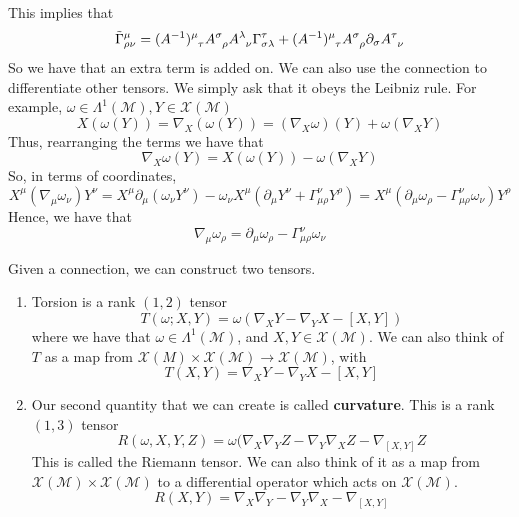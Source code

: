 \documentclass[11pt, a4paper]{article}   	%
\theoremstyle{slplain}
\begin{document}
This implies that 
\[
	\tilde{ \Gamma } ^ \mu _{ \rho \nu }  = ( A ^{ -1 } ) \indices{ ^ \mu _ \tau } A \indices{ ^ \sigma _ \rho } A \indices{ ^ \lambda _ \nu } \Gamma ^ \tau _{ \sigma \lambda } + ( A ^{ -1 } ) \indices{ ^ \mu _ \tau } A \indices{ ^ \sigma _ \rho } \partial  _ \sigma A \indices{ ^ \tau _ \nu }       
\]  So we have that an extra term is added on. 
We can also use the connection to differentiate 
other tensors. 
We simply ask that it obeys the Leibniz rule. 
For example, $ \omega \in \Lambda ^ 1 ( \mathcal{ M } ) , Y \in \mathcal{ X } ( \mathcal{ M } ) $ 
\[
	X ( \omega ( Y ) ) = \nabla _ X ( \omega ( Y ) )  = ( \nabla _ X \omega ) ( Y ) + \omega ( \nabla _ X Y ) 
\] Thus, rearranging the terms we have that 
\[
	\nabla _ X \omega ( Y )  = X ( \omega ( Y ) ) - \omega ( \nabla _ X Y ) 
\] So, in terms of coordinates, 
\[
	X^ \mu ( \nabla _ \mu \omega _ \nu ) Y ^ \nu = X^ \mu \partial  _ \mu ( \omega  _\nu Y ^ \nu ) - \omega _ \nu X^ \mu ( \partial  _ \mu Y ^ \nu + \Gamma ^ \nu _{ \mu \rho } Y ^ \rho )  = X ^ \mu ( \partial  _ \mu \omega _ \rho - \Gamma ^ \nu _{ \mu \rho } \omega _ \nu ) Y ^ \rho 
\] Hence, we have that 
\[
 \nabla _ \mu \omega _ \rho  = \partial  _ \mu \omega _ \rho  - \Gamma ^ \nu _{ \mu \rho } \omega _ \nu 
\]  %

Given a connection, we can construct two tensors. 
\begin{enumerate}
	\item Torsion is a rank $(1, 2) $ tensor
		\[
			T ( \omega; X, Y )  = \omega ( \nabla _ X Y - \nabla _ Y X - [ X, Y ] ) 
		\] where we have that $ \omega \in \Lambda^ 1 ( \mathcal{ M } ) $, 
		and $ X, Y \in \mathcal{ X } ( \mathcal{ M } ) $. 
		We can also think of $ T $ as a map from 
		$ \mathcal{ X } ( M ) \times \mathcal{ X } ( \mathcal{ M } ) \to \mathcal{ X } ( \mathcal{ M } ) $, with 
		\[
			T ( X, Y ) = \nabla _ X Y - \nabla _ Y X - [ X, Y ] 
		\] 
	\item Our second quantity that we can create is called \textbf{curvature}. 
		This is a rank $ ( 1, 3 )  $  tensor
		\[
			R ( \omega, X, Y , Z ) = \omega ( \nabla _ X \nabla  _ Y Z - \nabla _ Y \nabla  _ X Z - \nabla _{ [ X, Y ]  } Z 
		\] This is called the Riemann tensor. We can 
		also think of it as a map from $ \mathcal{ X  } ( \mathcal{ M } ) \times \mathcal{ X } ( \mathcal{ M } ) $ to a differential operator which 
		acts on $\mathcal{ X } ( \mathcal{ M } ) $. 
		\[
			R( X, Y ) = \nabla _ X \nabla  _ Y - \nabla  _ Y \nabla  _ X - \nabla _{ [ X, Y ] }
		\] 
\end{enumerate}
\end{document}
